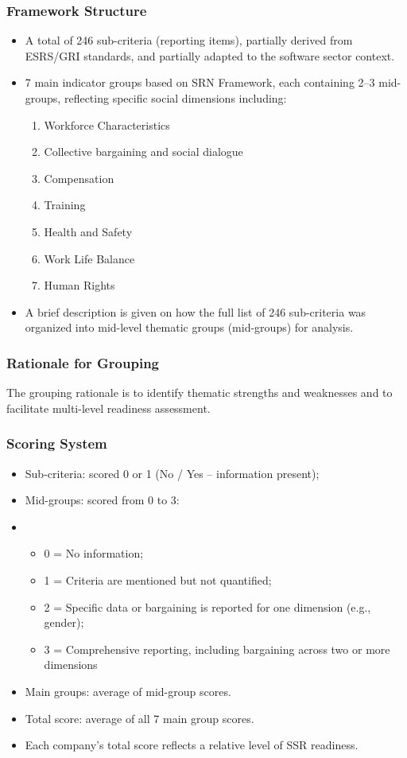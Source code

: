 \subsubsection{Framework Structure}
\begin{itemize}
    \item A total of 246 sub-criteria (reporting items), partially derived from ESRS/GRI standards, and partially adapted to the 
    software sector context.
    \item 7 main indicator groups based on SRN Framework, each containing 2--3 mid-groups, reflecting specific social dimensions including:
    \begin{enumerate}
        \item Workforce Characteristics
        \item Collective bargaining and social dialogue
        \item Compensation
        \item Training
        \item Health and Safety
        \item Work Life Balance
        \item Human Rights
    \end{enumerate}
    \item A brief description is given on 
    how the full list of 246 sub-criteria was organized into mid-level thematic groups (mid-groups) for analysis. 
\end{itemize}

\subsubsection{Rationale for Grouping}
The grouping rationale is to identify thematic strengths and weaknesses and to facilitate 
multi-level readiness assessment.

\subsubsection{Scoring System}
\begin{itemize}
    \item Sub-criteria: scored 0 or 1 (No / Yes -- information present);
    \item Mid-groups: scored from 0 to 3:
    \item \begin{itemize}
        \item 0 = No information;
        \item 1 = Criteria are mentioned but not quantified;
        \item 2 = Specific data or bargaining is reported for one dimension (e.g., gender);
        \item 3 = Comprehensive reporting, including bargaining across two or more dimensions
    \end{itemize}
    \item Main groups: average of mid-group scores.
    \item Total score: average of all 7 main group scores.
    \item Each company's total score reflects a relative level of SSR readiness.
\end{itemize}

